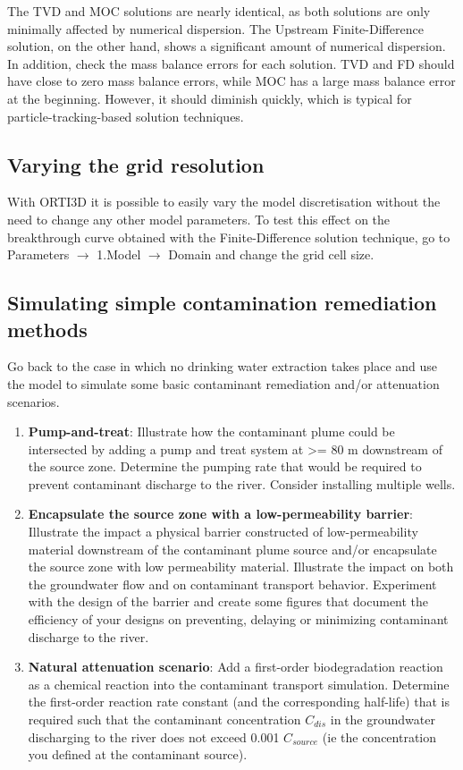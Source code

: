 The TVD and MOC solutions are nearly identical, as both solutions are only 
minimally affected by numerical dispersion. The Upstream Finite-Difference solution, 
on the other hand, shows a significant amount of numerical dispersion.
In addition, check the mass balance errors for each solution. TVD and FD should have
close to zero mass balance errors, while MOC has a large mass balance error at the
beginning. However, it should diminish quickly, which is typical for 
particle-tracking-based solution techniques.

\subsection{Varying the grid resolution}

With ORTI3D it is possible to easily vary the model discretisation
without the need to change any other model parameters.
To test this effect on the breakthrough curve obtained with the Finite-Difference solution technique, 
go to {\color{blue}Parameters} $\rightarrow$ {\color{blue}1.Model} 
$\rightarrow$ {\color{blue}Domain} and change the grid cell size.	 

\subsection{Simulating simple contamination remediation methods}
%	 
Go back to the case in which no drinking water extraction takes place and use the model to simulate some basic contaminant remediation and/or attenuation scenarios.
\begin{enumerate}
	\item \textbf{Pump-and-treat}: Illustrate how the contaminant plume could be
      intersected by adding a pump and treat system at >= 80 m downstream of the source zone. Determine the
      pumping rate that would be required to prevent contaminant discharge to the river. Consider 
	  installing multiple wells.
	\item \textbf{Encapsulate the source zone with a low-permeability barrier}: Illustrate
	  the impact a physical barrier constructed of low-permeability material downstream of the contaminant
	  plume source and/or encapsulate the source zone with low permeability material. Illustrate the impact
	  on both the groundwater flow and on contaminant transport behavior. Experiment with the design of 
	  the barrier and create some figures that document the efficiency of your designs on preventing, 
	  delaying or minimizing contaminant discharge to the river.
	\item \textbf{Natural attenuation scenario}: Add a first-order biodegradation reaction as a chemical
	  reaction into the contaminant transport simulation. Determine the first-order reaction rate constant
	  (and the corresponding half-life) that is required such that the contaminant concentration $C_{dis}$ in
	  the groundwater discharging to the river does not exceed 0.001 $C_{source}$ (ie the concentration you
	  defined at the contaminant source).

\end{enumerate}